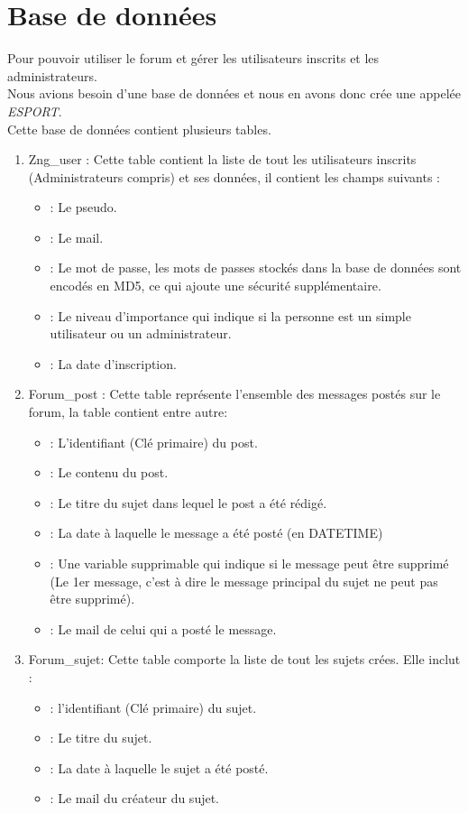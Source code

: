 \documentclass[a4paper, 11pt]{article}
\begin{document}
\section{Base de données}
Pour pouvoir utiliser le forum et gérer les utilisateurs inscrits et les administrateurs.\\
Nous avions besoin d'une base de données et nous en avons donc crée une appelée \textit{ESPORT}.\\
Cette base de données contient plusieurs tables.
\begin{enumerate}
\item Zng\_user : Cette table contient la liste de tout les utilisateurs inscrits (Administrateurs compris) et ses données, il contient les champs suivants :
  \begin{itemize}
  \item : Le pseudo.
  \item : Le mail.
  \item : Le mot de passe, les mots de passes stockés dans la base de données sont encodés en MD5, ce qui ajoute une sécurité supplémentaire.
  \item : Le niveau d'importance qui indique si la personne est un simple utilisateur ou un administrateur.
  \item : La date d'inscription.
  \end{itemize}
\item Forum\_post : Cette table représente l'ensemble des messages postés sur le forum, la table contient entre autre:
  \begin{itemize}
  \item : L'identifiant (Clé primaire) du post.
  \item : Le contenu du post.
  \item : Le titre du sujet dans lequel le post a été rédigé.
  \item : La date à laquelle le message a été posté (en DATETIME)
  \item : Une variable supprimable qui indique si le message peut être supprimé (Le 1er message, c'est à dire le message principal du sujet ne peut pas
    être supprimé).
  \item : Le mail de celui qui a posté le message.
  \end{itemize}
\item Forum\_sujet: Cette table comporte la liste de tout les sujets crées. Elle inclut :
  \begin{itemize}
  \item : l'identifiant (Clé primaire) du sujet. 
  \item : Le titre du sujet.
  \item : La date à laquelle le sujet a été posté.
  \item : Le mail du créateur du sujet.
  \end{itemize}
\end{enumerate}
\end{document}
